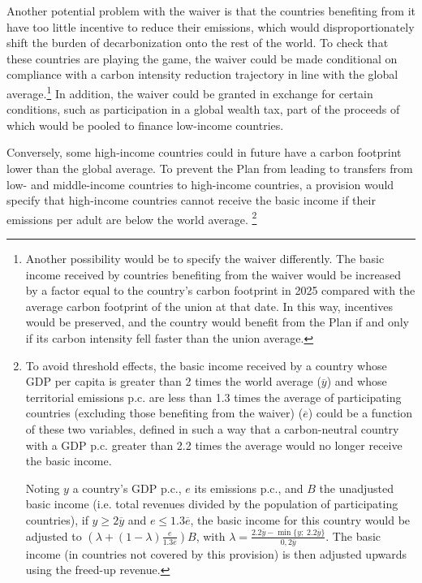 \documentclass[a5paper,english,openany]{memoir}
\begin{document}
Another potential problem with the waiver is that the countries benefiting from it have too little incentive to reduce their emissions, which would disproportionately shift the burden of decarbonization onto the rest of the world. To check that these countries are playing the game, the waiver could be made conditional on compliance with a carbon intensity reduction trajectory in line with the global average.\footnote{Another possibility would be to specify the waiver differently. The basic income received by countries benefiting from the waiver would be increased by a factor equal to the country's carbon footprint in 2025 compared with the average carbon footprint of the union at that date. In this way, incentives would be preserved, and the country would benefit from the Plan if and only if its carbon intensity fell faster than the union average.} 
In addition, the waiver could be granted in exchange for certain conditions, such as participation in a global wealth tax, part of the proceeds of which would be pooled to finance low-income countries.

Conversely, some high-income countries could in future have a carbon footprint lower than the global average. To prevent the Plan from leading to transfers from low- and middle-income countries to high-income countries, a provision would specify that high-income countries cannot receive the basic income if their emissions per adult are below the world average.%
\footnote{To avoid threshold effects, the basic income received by a country whose GDP per capita is greater than 2 times the world average ($\overline{y}$) and whose territorial emissions p.c. are less than 1.3 times the average of participating countries (excluding those benefiting from the waiver) ($\overline{e}$) could be a function of these two variables, defined in such a way that a carbon-neutral country with a GDP p.c. greater than 2.2 times the average would no longer receive the basic income. 

Noting $y$ a country's GDP p.c., $e$ its emissions p.c., and $B$ the unadjusted basic income (i.e. total revenues divided by the population of participating countries), if $y\geq 2\overline{y}$ and $e \leq 1.3 \overline{e}$, the basic income for this country would be adjusted to $\left(\lambda + \left(1-\lambda \right) \frac{e}{1.3\overline{e}} \right) B$, with $\lambda = \frac{2.2\overline{y}-\min\{y;\;2.2\overline{y}\}}{0,2\overline{y}}$. 
The basic income (in countries not covered by this provision) is then adjusted upwards using the freed-up revenue.} 
\end{document}
